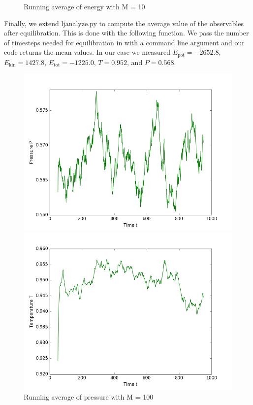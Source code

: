 \begin{figure}[h]
  \caption{Running average of energy with M = 10}\label{fig:energy1}
\endminipage
\end{figure}

Finally, we extend ljanalyze.py to compute the average value of the observables after equilibration. This is done with the following function.
We pass the number of timesteps needed for equilibration in with a command line argument and our code returns the mean values.
In our case we measured $E_\mathrm{pot} = -2652.8$, $E_\mathrm{kin} = 1427.8$, $E_\mathrm{tot} = -1225.0$, $T = 0.952$, and $P = 0.568$.

\begin{figure}[h]
  \includegraphics[width=\linewidth]{fig/avPressure_M100.png}
  \caption{Running average of pressure with M = 100}\label{fig:pres2}
\endminipage\hfill
{}
  \includegraphics[width=\linewidth]{fig/avTemperature_M100.png}

\end{figure}
